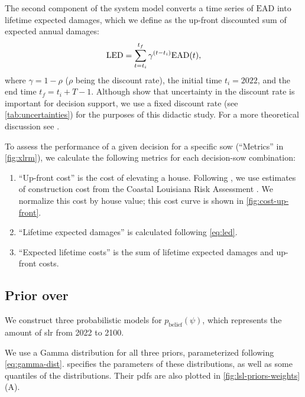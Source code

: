 \documentclass{agujournal2019}
\begin{document}
The second component of the system model converts a time series of $\mathrm{EAD}$ into lifetime expected damages, which we define as the up-front  discounted sum of expected annual damages:
\begin{equation}\label{eq:led}
  \textrm{LED} = \sum_{t=t_i}^{t_f} \gamma^{\qty(t-t_i)} \textrm{EAD}(t),
\end{equation}
where  $\gamma = 1- \rho$ ($\rho$ being the discount rate), the initial time $t_i=2022$, and the end time $t_f = t_i + T - 1$.
Although  show that uncertainty in the discount rate is important for decision support, we use a fixed discount rate (see \cref{tab:uncertainties}) for the purposes of this didactic study.
For a more theoretical discussion see .

To assess the performance of a given decision for a specific \gls{sow} (``Metrics'' in \cref{fig:xlrm}), we calculate the following metrics for each decision-\gls{sow} combination:
\begin{enumerate}
  \item ``Up-front cost'' is the cost of elevating a house. Following , we use estimates of construction cost from the Coastal Louisiana Risk Assessment \cite{fischbach_clara:2012}. We normalize this cost by house value; this cost curve is shown in \cref{fig:cost-up-front}.
  \item ``Lifetime expected damages'' is calculated following \cref{eq:led}.
  \item ``Expected lifetime costs'' is the sum of lifetime expected damages and up-front costs.
\end{enumerate}

\subsection{Prior over }\label{sec:case-priors}

We construct three probabilistic models for $p_\mathrm{belief}(\psi)$, which represents the amount of \gls{slr} from 2022 to 2100.

We use a Gamma distribution for all three priors, parameterized following \cref{eq:gamma-dist}.
 specifies the parameters of these distributions, as well as some quantiles of the distributions.
Their \glspl{pdf} are also plotted in \cref{fig:lsl-priors-weights}(A).
\end{document}
